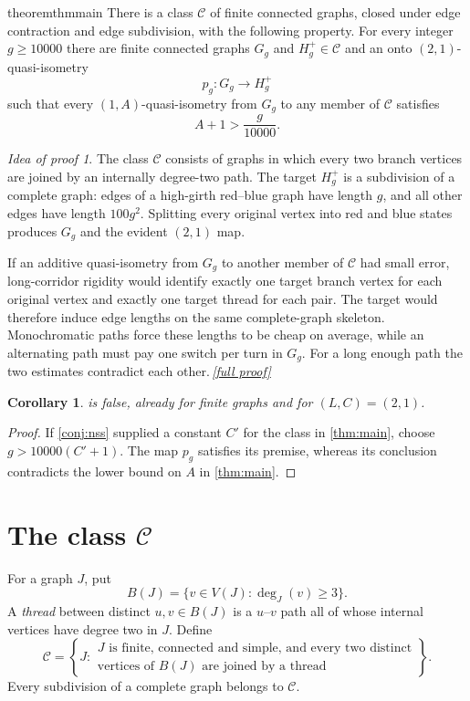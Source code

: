\documentclass[11pt,a4paper]{article}
\theoremstyle{plain}
\newtheorem{corollary}[theorem]{Corollary}
\theoremstyle{definition}
\theoremstyle{remark}
\newtheorem*{proofidea}{Idea of proof}
\newcommand{\fullproofref}[1]{\,\hyperref[#1]{\textit{[full proof]}}}
\newcommand{\cC}{\mathcal C}
\newcommand{\Gg}{G_g}
\newcommand{\Hp}{H_g^{+}}
\begin{document}
\begin{restatable}{theorem}{thmmain}\label{thm:main}
There is a class $\cC$ of finite connected graphs, closed under edge contraction and edge subdivision, with the following property. For every integer $g\ge10000$ there are finite connected graphs $\Gg$ and $\Hp\in\cC$ and an onto $(2,1)$-quasi-isometry
\[
 p_g\colon \Gg\longrightarrow\Hp
\]
such that every $(1,A)$-quasi-isometry from $\Gg$ to any member of $\cC$ satisfies
\[
 A+1>\frac{g}{10000}.
\]
\end{restatable}
\begin{proofidea}
The class $\cC$ consists of graphs in which every two branch vertices are joined by an internally degree-two path. The target $\Hp$ is a subdivision of a complete graph: edges of a high-girth red--blue graph have length $g$, and all other edges have length $100g^2$. Splitting every original vertex into red and blue states produces $\Gg$ and the evident $(2,1)$ map.

If an additive quasi-isometry from $\Gg$ to another member of $\cC$ had small error, long-corridor rigidity would identify exactly one target branch vertex for each original vertex and exactly one target thread for each pair. The target would therefore induce edge lengths on the same complete-graph skeleton. Monochromatic paths force these lengths to be cheap on average, while an alternating path must pay one switch per turn in $\Gg$. For a long enough path the two estimates contradict each other.\fullproofref{pf:main}
\end{proofidea}

\begin{corollary}\label{cor:disproof}
 is false, already for finite graphs and for $(L,C)=(2,1)$.
\end{corollary}
\begin{proof}
If \cref{conj:nss} supplied a constant $C'$ for the class in \cref{thm:main}, choose $g>10000(C'+1)$. The map $p_g$ satisfies its premise, whereas its conclusion contradicts the lower bound on $A$ in \cref{thm:main}.
\end{proof}

\section{The class \texorpdfstring{$\cC$}{C}}\label{sec:class}

For a graph $J$, put
\[
 B(J)=\{v\in V(J):\deg_J(v)\ge3\}.
\]
A \emph{thread} between distinct $u,v\in B(J)$ is a $u$--$v$ path all of whose internal vertices have degree two in $J$. Define
\[
 \cC=\left\{J:
 \begin{array}{l}
 J\text{ is finite, connected and simple, and every two distinct}\\
 \text{vertices of }B(J)\text{ are joined by a thread}
 \end{array}\right\}.
\tag{2.1}\label{eq:class-definition}
\]
Every subdivision of a complete graph belongs to $\cC$.
\end{document}
